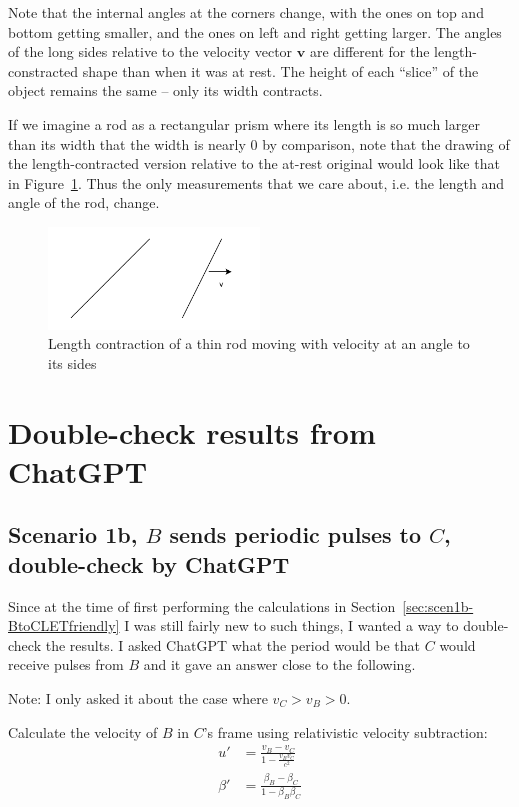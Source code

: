 \documentclass[a4paper]{article}
\theoremstyle{plain}
\theoremstyle{definition}
\newcommand{\vect}[1]{\mathbf{#1}}
\begin{document}
Note that the internal angles at the corners change, with the ones on
top and bottom getting smaller, and the ones on left and right getting
larger.  The angles of the long sides relative to the velocity vector
$\vect{v}$ are different for the length-constracted shape than when it
was at rest.  The height of each ``slice'' of the object remains the
same -- only its width contracts.

If we imagine a rod as a rectangular prism where its length is so much
larger than its width that the width is nearly 0 by comparison, note
that the drawing of the length-contracted version relative to the
at-rest original would look like that in
Figure~\ref{fig:diagonal-length-contraction-of-rod}.  Thus the only
measurements that we care about, i.e. the length and angle of the rod,
change.
\begin{figure}[ht]
	\centering
	\includegraphics[width=0.5\textwidth]{length-contraction-rod-at-angle-cropped.pdf}
	\caption{Length contraction of a thin rod moving with velocity at an angle to its sides}
	\label{fig:diagonal-length-contraction-of-rod}
\end{figure}


\section{Double-check results from ChatGPT}


\subsection{Scenario 1b, $B$ sends periodic pulses to $C$, double-check by ChatGPT}
\label{sec:scen1b-BtoCdoublecheck}

Since at the time of first performing the calculations in
Section~\ref{sec:scen1b-BtoCLETfriendly} I was still fairly new to
such things, I wanted a way to double-check the results.  I asked
ChatGPT what the period would be that $C$ would receive pulses from
$B$ and it gave an answer close to the following.

Note: I only asked it about the case where $v_C > v_B > 0$.

Calculate the velocity of $B$ in $C$'s frame using relativistic
velocity subtraction:
\begin{align}
u' & = \frac{v_B - v_C}{1 - \frac{v_B v_C}{c^2}} \\
\beta' & = \frac{\beta_B - \beta_C}{1 - \beta_B \beta_C}
\end{align}
\end{document}
